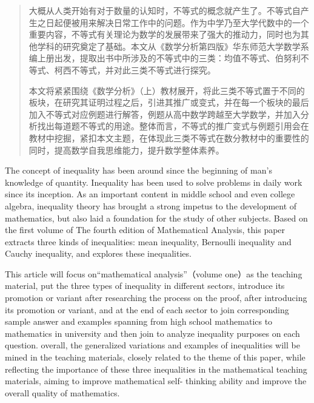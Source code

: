 \documentclass{CCNUthesis}
\begin{document}



\frontmatter


\tableofcontents


\begin{abstract}
  大概从人类开始有对于数量的认知时，不等式的概念就产生了。不等式自产生之日起便被用来解决日常工作中的问题。作为中学乃至大学代数中的一个重要内容，不等式有关理论为数学的发展带来了强大的推动力，同时也为其他学科的研究奠定了基础。本文从《数学分析第四版》华东师范大学数学系编上册出发，提取出书中所涉及的不等式中的三类：均值不等式、伯努利不等式、柯西不等式，并对此三类不等式进行探究。

  本文将紧紧围绕《数学分析》（上）教材展开，将此三类不等式置于不同的板块，在研究其证明过程之后，引进其推广或变式，并在每一个板块的最后加入不等式对应例题进行解答，例题从高中数学跨越至大学数学，并加入分析找出每道题不等式的用途。整体而言，不等式的推广变式与例题引用会在教材中挖掘，紧扣本文主题，在体现此三类不等式在数分教材中的重要性的同时，提高数学自我思维能力，提升数学整体素养。
\end{abstract}

\begin{abstract*}
  The concept of inequality has been around since the beginning of man's knowledge of quantity. Inequality has been used to solve problems in daily work since its inception. As an important content in middle school and even college algebra, inequality theory has brought a strong impetus to the development of mathematics, but also laid a foundation for the study of other subjects. Based on the first volume of The fourth edition of Mathematical Analysis, this paper extracts three kinds of inequalities: mean inequality, Bernoulli inequality and Cauchy inequality, and explores these inequalities.

  This article will focus on“mathematical analysis”（volume one）as the teaching material, put the three types of inequality in different sectors, introduce its promotion or variant after researching the process on the proof, after introducing its promotion or variant, and at the end of each sector to join corresponding sample answer and examples spanning from high school mathematics to mathematics in university and then join to analyze inequality purposes on each question. overall, the generalized variations and examples of inequalities will be mined in the teaching materials, closely related to the theme of this paper, while reflecting the importance of these three inequalities in the mathematical teaching materials, aiming to improve mathematical self- thinking ability and improve the overall quality of mathematics.
\end{abstract*}
\end{document}
